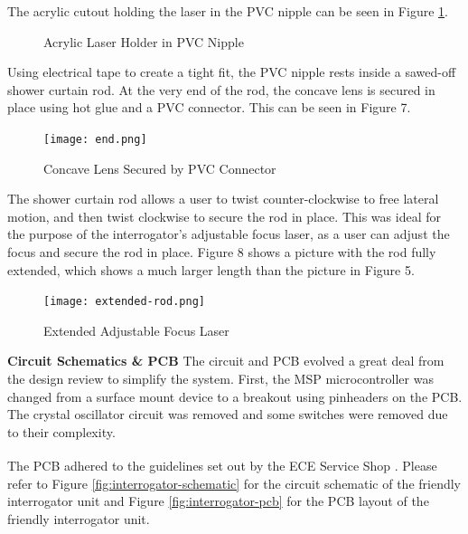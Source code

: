 \documentclass[letterpaper,10pt]{article}
\begin{document}
\begin{spacing}{1.15}
The acrylic cutout holding the laser in the PVC nipple can be seen in Figure \ref{fig:acrylic}.

	\begin{figure}%
		\centering
		\qquad
		\caption{Acrylic Laser Holder in PVC Nipple}%
		\label{fig:acrylic}%
	\end{figure}
	
Using electrical tape to create a tight fit, the PVC nipple rests inside a sawed-off shower curtain rod. At the very end of the rod, the concave lens is secured in place using hot glue and a PVC connector. This can be seen in Figure 7.

\begin{figure} [H]
	\centering
	\texttt{[image: end.png]}
	\caption{Concave Lens Secured by PVC Connector	\label{fig:end}}
\end{figure}

The shower curtain rod allows a user to twist counter-clockwise to free lateral motion, and then twist clockwise to secure the rod in place. This was ideal for the purpose of the interrogator's adjustable focus laser, as a user can adjust the focus and secure the rod in place. Figure 8 shows a picture with the rod fully extended, which shows a much larger length than the picture in Figure 5.

\begin{figure} [H]
	\centering
	\texttt{[image: extended-rod.png]}
	\label{fig:extended}
	\caption{Extended Adjustable Focus Laser}
\end{figure}

\hspace{5mm}\textbf{Circuit Schematics \& PCB} \label{section:interrogator-circuit-schematics-design-details}
The circuit and PCB evolved a great deal from the design review to simplify the system. First, the MSP microcontroller was changed from a surface mount device to a breakout using pinheaders on the PCB. The crystal oscillator circuit was removed and some switches were removed due to their complexity.

The PCB adhered to the guidelines set out by the ECE Service Shop \textsuperscript{\cite{ECE-Electronics-Shop}}.
Please refer to Figure \autoref{fig:interrogator-schematic} for the circuit schematic of the friendly interrogator unit and Figure \autoref{fig:interrogator-pcb} for the PCB layout of the friendly interrogator unit. 




\end{spacing}
\end{document}
